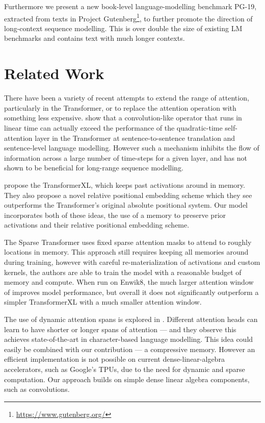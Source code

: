 \documentclass{article} \usepackage{iclr2020_conference,times}
\newcommand{\dataset}{PG-19}
\begin{document}
Furthermore we present a new book-level language-modelling benchmark \dataset, extracted from texts in Project Gutenberg\footnote{\url{https://www.gutenberg.org/}}, to further promote the direction of long-context sequence modelling. This is over double the size of existing LM benchmarks and contains text with much longer contexts.
\section{Related Work}
There have been a variety of recent attempts to extend the range of attention, particularly in the Transformer, or to replace the attention operation with something less expensive. \citet{wu2019pay} show that a convolution-like operator that runs in linear time can actually exceed the performance of the quadratic-time self-attention layer in the Transformer at sentence-to-sentence translation and sentence-level language modelling. However such a mechanism inhibits the flow of information across a large number of time-steps for a given layer, and has not shown to be beneficial for long-range sequence modelling.

\citet{dai2019transformer} propose the TransformerXL, which keeps past activations around in memory. They also propose a novel relative positional embedding scheme which they see outperforms the Transformer's original absolute positional system. Our model incorporates both of these ideas, the use of a memory to preserve prior activations and their relative positional embedding scheme.

The Sparse Transformer \citep{child2019generating} uses fixed sparse attention masks to attend to roughly  locations in memory. This approach still requires keeping all memories around during training, however with careful re-materialization of activations and custom kernels, the authors are able to train the model with a reasonable budget of memory and compute. When run on Enwik8, the much larger attention window of  improves model performance, but overall it does not significantly outperform a simpler TransformerXL with a much smaller attention window.

The use of dynamic attention spans is explored in \citet{sukhbaatar2019adaptive}. Different attention heads can learn to have shorter or longer spans of attention --- and they observe this achieves state-of-the-art in character-based language modelling. This idea could easily be combined with our contribution --- a compressive memory. However an efficient implementation is not possible on current dense-linear-algebra accelerators, such as Google's TPUs, due to the need for dynamic and sparse computation. Our approach builds on simple dense linear algebra components, such as convolutions.
\end{document}
